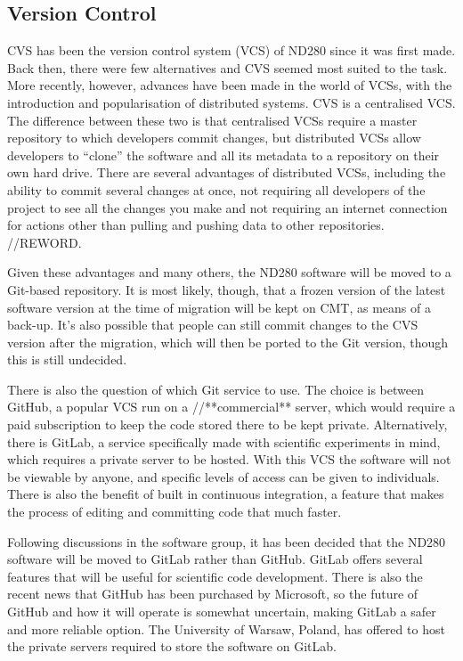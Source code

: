 \documentclass[aps,pra,12pt,notitlepage,tightenlines]{revtex4-1}
\begin{document}
\subsection{Version Control}
CVS has been the version control system (VCS) of ND280 since it was first made. Back then, there were few alternatives and CVS seemed most suited to the task. More recently, however, advances have been made in the world of VCSs, with the introduction and popularisation of distributed systems. CVS is a centralised VCS. The difference between these two is that centralised VCSs require a master repository to which developers commit changes, but distributed VCSs allow developers to ``clone'' the software and all its metadata to a repository on their own hard drive. There are several advantages of distributed VCSs, including the ability to commit several changes at once, not requiring all developers of the project to see all the changes you make and not requiring an internet connection for actions other than pulling and pushing data to other repositories. //REWORD.

Given these advantages and many others, the ND280 software will be moved to a Git-based repository. It is most likely, though, that a frozen version of the latest software version at the time of migration will be kept on CMT, as means of a back-up. It's also possible that people can still commit changes to the CVS version after the migration, which will then be ported to the Git version, though this is still undecided.

There is also the question of which Git service to use. The choice is between GitHub, a popular VCS run on a //**commercial** server, which would require a paid subscription to keep the code stored there to be kept private. Alternatively, there is GitLab, a service specifically made with scientific experiments in mind, which requires a private server to be hosted. With this VCS the software will not be viewable by anyone, and specific levels of access can be given to individuals. There is also the benefit of built in continuous integration, a feature that makes the process of editing and committing code that much faster.

Following discussions in the software group, it has been decided that the ND280 software will be moved to GitLab rather than GitHub. GitLab offers several features that will be useful for scientific code development. There is also the recent news that GitHub has been purchased by Microsoft, so the future of GitHub and how it will operate is somewhat uncertain, making GitLab a safer and more reliable option. The University of Warsaw, Poland, has offered to host the private servers required to store the software on GitLab.
\end{document}
